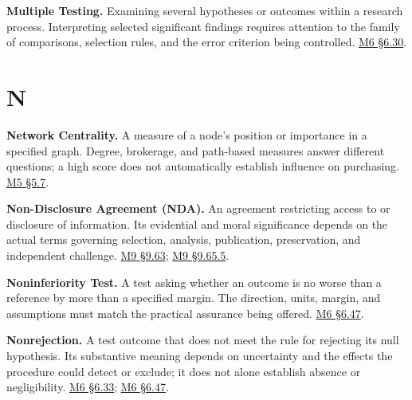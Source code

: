 \noindent\textbf{Multiple Testing.} Examining several hypotheses or outcomes
within a research process. Interpreting selected significant findings
requires attention to the family of comparisons, selection rules, and
the error criterion being controlled.
\href{Marketing_Analytics_Lecture_Notes.pdf\#M06-store-assignment-and-false-discoveries}{M6
§6.30}.

\par{}
\hypertarget{module-n}{%
\section*{N}\label{module-n}}

\noindent\textbf{Network Centrality.} A measure of a node's position or
importance in a specified graph. Degree, brokerage, and path-based
measures answer different questions; a high score does not automatically
establish influence on purchasing.
\href{Marketing_Analytics_Lecture_Notes.pdf\#M05-networks-connections-reach-and-brokerage}{M5
§5.7}.

\noindent\textbf{Non-Disclosure Agreement (NDA).} An agreement restricting access
to or disclosure of information. Its evidential and moral significance
depends on the actual terms governing selection, analysis, publication,
preservation, and independent challenge.
\hyperref[M09-research-under-confidentiality-agreements]{M9
§9.63};
\hyperref[M09-worked-case-confidentiality-and-corporate-accountability]{M9
§9.65.5}.

\noindent\textbf{Noninferiority Test.} A test asking whether an outcome is no
worse than a reference by more than a specified margin. The direction,
units, margin, and assumptions must match the practical assurance being
offered.
\href{Marketing_Analytics_Lecture_Notes.pdf\#M06-choosing-the-null-for-a-claim-about-harm}{M6
§6.47}.

\noindent\textbf{Nonrejection.} A test outcome that does not meet the rule for
rejecting its null hypothesis. Its substantive meaning depends on
uncertainty and the effects the procedure could detect or exclude; it
does not alone establish absence or negligibility.
\href{Marketing_Analytics_Lecture_Notes.pdf\#M06-testing-electricity-price-interpretations-against-the-reported-tables}{M6
§6.33};
\href{Marketing_Analytics_Lecture_Notes.pdf\#M06-choosing-the-null-for-a-claim-about-harm}{M6
§6.47}.

